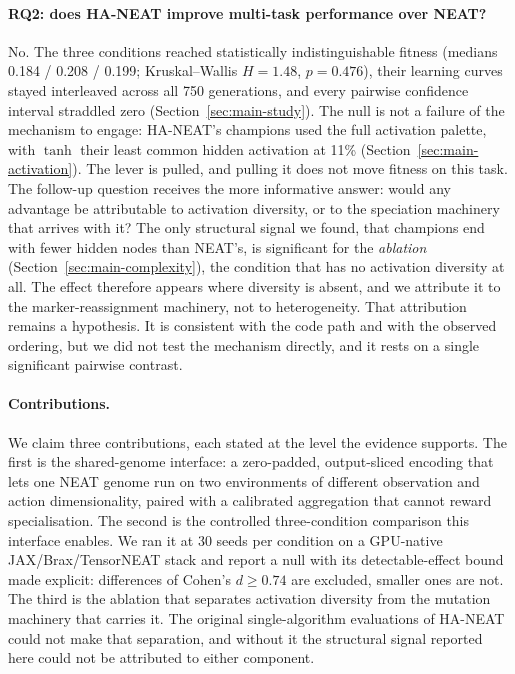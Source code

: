 \documentclass[12pt]{article}
\begin{document}
\paragraph{RQ2: does HA-NEAT improve multi-task performance over NEAT?}
No.
The three conditions reached statistically indistinguishable fitness (medians 0.184 / 0.208 / 0.199; Kruskal--Wallis $H = 1.48$, $p = 0.476$), their learning curves stayed interleaved across all 750 generations, and every pairwise confidence interval straddled zero (Section~\ref{sec:main-study}).
The null is not a failure of the mechanism to engage: HA-NEAT's champions used the full activation palette, with $\tanh$ their least common hidden activation at 11\% (Section~\ref{sec:main-activation}).
The lever is pulled, and pulling it does not move fitness on this task.
The follow-up question receives the more informative answer: would any advantage be attributable to activation diversity, or to the speciation machinery that arrives with it?
The only structural signal we found, that champions end with fewer hidden nodes than NEAT's, is significant for the \emph{ablation} (Section~\ref{sec:main-complexity}), the condition that has no activation diversity at all.
The effect therefore appears where diversity is absent, and we attribute it to the marker-reassignment machinery, not to heterogeneity.
That attribution remains a hypothesis. It is consistent with the code path and with the observed ordering, but we did not test the mechanism directly, and it rests on a single significant pairwise contrast.

\paragraph{Contributions.}
We claim three contributions, each stated at the level the evidence supports.
The first is the shared-genome interface: a zero-padded, output-sliced encoding that lets one NEAT genome run on two environments of different observation and action dimensionality, paired with a calibrated aggregation that cannot reward specialisation.
The second is the controlled three-condition comparison this interface enables. We ran it at 30 seeds per condition on a GPU-native JAX/Brax/TensorNEAT stack and report a null with its detectable-effect bound made explicit: differences of Cohen's $d \geq 0.74$ are excluded, smaller ones are not.
The third is the ablation that separates activation diversity from the mutation machinery that carries it. The original single-algorithm evaluations of HA-NEAT could not make that separation, and without it the structural signal reported here could not be attributed to either component.
\end{document}

